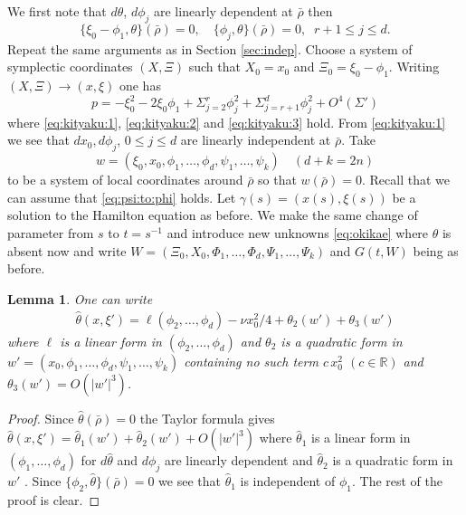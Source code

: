 \documentclass[12pt,leqno]{article} %
\def\R{{\mathbb R}}
\def\bro{\bar\rho}
\def\R{\mathbb{R}}
\def\bro{\bar\rho}
\numberwithin{equation}{section}
\newtheorem{lem}{Lemma}[section]
\begin{document}
We first note that $d\theta$, $d\phi_j$ are linearly dependent at $\bro$ then
%
\begin{equation}
\label{eq:lin:dep-1}
\{\xi_0-\phi_1,\theta\}(\bro)=0,\quad \{\phi_j,\theta\}(\bro)=0,\;\; r+1\leq j\leq d.
\end{equation}
%
Repeat the same arguments as in Section \ref{sec:indep}. Choose a system of symplectic coordinates $(X,\Xi)$ such that $X_0=x_0$ and $\Xi_0=\xi_0-\phi_1$. Writing $(X,\Xi)\to (x,\xi)$ one has 
%
\[
p=-\xi_0^2-2\xi_0\phi_1+\Sigma_{j=2}^r\phi_j^2+\Sigma_{j=r+1}^d\phi_j^2+O^4(\Sigma')
\]
%
where \eqref{eq:kityaku:1}, \eqref{eq:kityaku:2} and \eqref{eq:kityaku:3} hold.
%
%
From \eqref{eq:kityaku:1} we see that $dx_0, d\phi_j$, $0\leq j\leq d$ are linearly independent at $\bro$. Take 
%
\[
w=(\xi_0,x_0,\phi_1,\ldots,\phi_d,\psi_1,\ldots,\psi_k)\quad (d+k=2n)
\]
%
to be a system of local coordinates around ${\bar\rho}$ so that $w(\bro)=0$. Recall that we can assume that \eqref{eq:psi:to:phi} holds. 
Let $\gamma(s)=(x(s),\xi(s))$ be a solution to the Hamilton equation as before. We make the same change of parameter from $s$ to $t=s^{-1}$ and introduce new unknowns \eqref{eq:okikae} where $\hat\theta$ is absent now 
%
%
and write $W=(\Xi_0,X_0,\Phi_1,\ldots,\Phi_d,\Psi_1,\ldots,\Psi_k)$ and $G(t, W)$ being as before.
%
%
\begin{lem}
\label{lem:te:Tay}
One can write
%
\begin{gather*}
\hat\theta(x,\xi')=\ell(\phi_2,\ldots, \phi_d)-\nu x_0^2/4+\theta_2(w')
+\theta_3(w')
\end{gather*}
%
where $\ell $ is a linear form in $(\phi_2,\ldots, \phi_d)$ and $\theta_2$ is a quadratic form in $w'=(x_0,\phi_1,\ldots, \phi_d, \psi_1,\ldots,\psi_k)$ containing no such term  $c\,x_0^2$ $(c\in\R)$ and $\theta_3(w')=O(|w'|^3)$.
\end{lem}
%
\begin{proof}
Since $\hat\theta(\bro)=0$ the Taylor formula gives $
\hat\theta(x,\xi')=\hat\theta_1(w')+\hat\theta_2(w')+O(|w'|^3)$ where $\hat\theta_1$ is a linear form in $(\phi_1,\ldots,\phi_d)$ for  $d\hat\theta$ and $d\phi_j$ are linearly dependent and $\hat\theta_2$ is a quadratic form in $w'$ . Since $\{\phi_2,\hat\theta\}(\bro)=0$ we see that $\hat\theta_1$ is independent of $\phi_1$. The rest of the proof is clear.
\end{proof}
\end{document}
